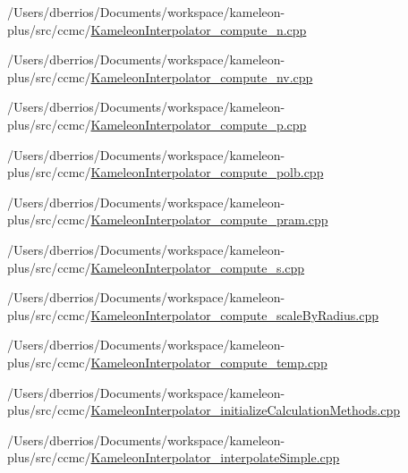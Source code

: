 \begin{DoxyCompactItemize}
/\-Users/dberrios/\-Documents/workspace/kameleon-\/plus/src/ccmc/\hyperlink{_kameleon_interpolator__compute__n_8cpp}{Kameleon\-Interpolator\-\_\-compute\-\_\-n.\-cpp}\item 
/\-Users/dberrios/\-Documents/workspace/kameleon-\/plus/src/ccmc/\hyperlink{_kameleon_interpolator__compute__nv_8cpp}{Kameleon\-Interpolator\-\_\-compute\-\_\-nv.\-cpp}\item 
/\-Users/dberrios/\-Documents/workspace/kameleon-\/plus/src/ccmc/\hyperlink{_kameleon_interpolator__compute__p_8cpp}{Kameleon\-Interpolator\-\_\-compute\-\_\-p.\-cpp}\item 
/\-Users/dberrios/\-Documents/workspace/kameleon-\/plus/src/ccmc/\hyperlink{_kameleon_interpolator__compute__polb_8cpp}{Kameleon\-Interpolator\-\_\-compute\-\_\-polb.\-cpp}\item 
/\-Users/dberrios/\-Documents/workspace/kameleon-\/plus/src/ccmc/\hyperlink{_kameleon_interpolator__compute__pram_8cpp}{Kameleon\-Interpolator\-\_\-compute\-\_\-pram.\-cpp}\item 
/\-Users/dberrios/\-Documents/workspace/kameleon-\/plus/src/ccmc/\hyperlink{_kameleon_interpolator__compute__s_8cpp}{Kameleon\-Interpolator\-\_\-compute\-\_\-s.\-cpp}\item 
/\-Users/dberrios/\-Documents/workspace/kameleon-\/plus/src/ccmc/\hyperlink{_kameleon_interpolator__compute__scale_by_radius_8cpp}{Kameleon\-Interpolator\-\_\-compute\-\_\-scale\-By\-Radius.\-cpp}\item 
/\-Users/dberrios/\-Documents/workspace/kameleon-\/plus/src/ccmc/\hyperlink{_kameleon_interpolator__compute__temp_8cpp}{Kameleon\-Interpolator\-\_\-compute\-\_\-temp.\-cpp}\item 
/\-Users/dberrios/\-Documents/workspace/kameleon-\/plus/src/ccmc/\hyperlink{_kameleon_interpolator__initialize_calculation_methods_8cpp}{Kameleon\-Interpolator\-\_\-initialize\-Calculation\-Methods.\-cpp}\item 
/\-Users/dberrios/\-Documents/workspace/kameleon-\/plus/src/ccmc/\hyperlink{_kameleon_interpolator__interpolate_simple_8cpp}{Kameleon\-Interpolator\-\_\-interpolate\-Simple.\-cpp}\end{DoxyCompactItemize}

